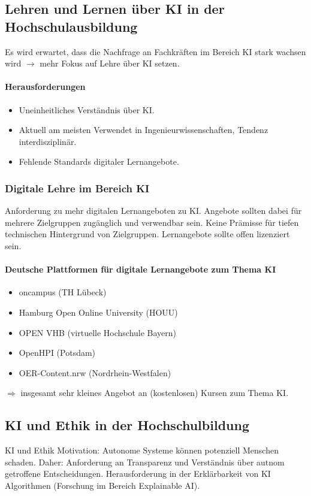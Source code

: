 \subsection{Lehren und Lernen über KI in der Hochschulausbildung}
Es wird erwartet, dass die Nachfrage an Fachkräften im Bereich KI stark wachsen wird $\rightarrow$ mehr Fokus auf Lehre über KI setzen.

\paragraph*{Herausforderungen}
\begin{itemize}
    \item Uneinheitliches Verständnis über KI.
    \item Aktuell am meisten Verwendet in Ingenieurwissenschaften, Tendenz interdisziplinär.
    \item Fehlende Standards digitaler Lernangebote.
\end{itemize}

\subsubsection*{Digitale Lehre im Bereich KI}
Anforderung zu mehr digitalen Lernangeboten zu KI. Angebote sollten dabei für mehrere Zielgruppen zugänglich und verwendbar sein. Keine Prämisse für tiefen technischen Hintergrund von Zielgruppen. Lernangebote sollte offen lizenziert sein.

\paragraph*{Deutsche Plattformen für digitale Lernangebote zum Thema KI}
\begin{itemize}
    \item oncampus (TH Lübeck)
    \item Hamburg Open Online University (HOUU)
    \item OPEN VHB (virtuelle Hochschule Bayern)
    \item OpenHPI (Potsdam)
    \item OER-Content.nrw (Nordrhein-Westfalen)
\end{itemize}
$\Rightarrow$ insgesamt sehr kleines Angebot an (kostenlosen) Kursen zum Thema KI.

\subsection{KI und Ethik in der Hochschulbildung}
KI und Ethik Motivation: Autonome Systeme können potenziell Menschen schaden. Daher: Anforderung an Transparenz und Verständnis über autnom getroffene Entscheidungen. Herausforderung in der Erklärbarkeit von KI Algorithmen (Forschung im Bereich \glqq Explainable AI\grqq{}).


